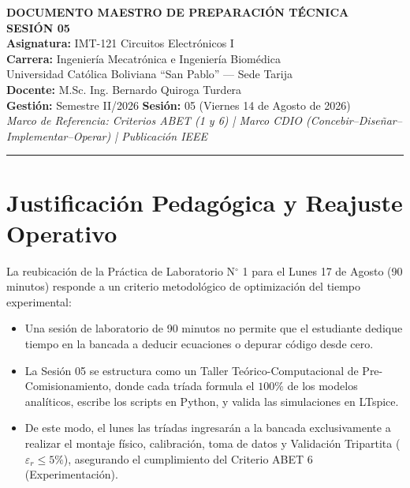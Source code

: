 \documentclass[11pt, a4paper]{article}
\begin{document}
\begin{center}
    {\LARGE \textbf{DOCUMENTO MAESTRO DE PREPARACIÓN TÉCNICA}} \\[0.2cm]
    {\Large \textbf{SESIÓN 05}} \\[0.4cm]
    \normalsize
    \textbf{Asignatura:} IMT-121 Circuitos Electrónicos I \\
    \textbf{Carrera:} Ingeniería Mecatrónica e Ingeniería Biomédica \\
    Universidad Católica Boliviana ``San Pablo'' — Sede Tarija \\[0.2cm]
    \textbf{Docente:} M.Sc. Ing. Bernardo Quiroga Turdera \\
    \textbf{Gestión:} Semestre II/2026 \hspace{0.5cm} \textbf{Sesión:} 05 (Viernes 14 de Agosto de 2026) \\[0.2cm]
    \textit{Marco de Referencia: Criterios ABET (1 y 6) | Marco CDIO (Concebir–Diseñar–Implementar–Operar) | Publicación IEEE}
    \vspace{0.3cm}
\end{center}

\hrule
\vspace{0.4cm}

\section{Justificación Pedagógica y Reajuste Operativo}
\begin{tcolorbox}[caja_justificacion, title=1. Justificación del Reajuste]
La reubicación de la Práctica de Laboratorio N$^\circ$ 1 para el Lunes 17 de Agosto (90 minutos) responde a un criterio metodológico de optimización del tiempo experimental:
\begin{itemize}[label=\textcolor{ucbblue}{\textbullet}]
    \item Una sesión de laboratorio de 90 minutos no permite que el estudiante dedique tiempo en la bancada a deducir ecuaciones o depurar código desde cero.
    \item La Sesión 05 se estructura como un Taller Teórico-Computacional de Pre-Comisionamiento, donde cada tríada formula el $100\%$ de los modelos analíticos, escribe los scripts en Python, y valida las simulaciones en LTspice.
    \item De este modo, el lunes las tríadas ingresarán a la bancada exclusivamente a realizar el montaje físico, calibración, toma de datos y Validación Tripartita ($\varepsilon_r \le 5\%$), asegurando el cumplimiento del Criterio ABET 6 (Experimentación).
\end{itemize}
\end{tcolorbox}
\end{document}
